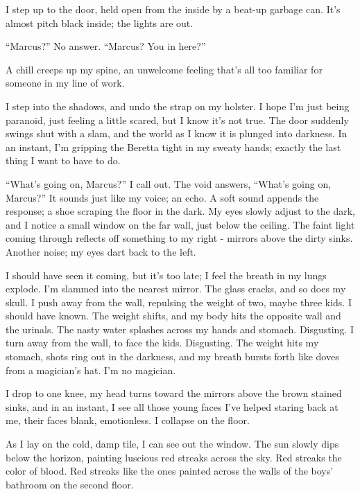I step up to the door, held open from the inside by a beat-up
garbage can. It's almost pitch black inside; the lights are
out.



``Marcus?'' No answer. ``Marcus? You in here?''



A chill creeps up my spine, an unwelcome feeling that's all too
familiar for someone in my line of work.



I step into the shadows, and undo the strap on my holster. I hope
I'm just being paranoid, just feeling a little scared, but I know
it's not true. The door suddenly swings shut with a slam, and the
world as I know it is plunged into darkness. In an instant, I'm
gripping the Beretta tight in my sweaty hands; exactly the last
thing I want to have to do.



``What's going on, Marcus?'' I call out. The void answers, ``What's
going on, Marcus?'' It sounds just like my voice; an echo. A soft
sound appends the response; a shoe scraping the floor in the dark.
My eyes slowly adjust to the dark, and I notice a small window on
the far wall, just below the ceiling. The faint light coming
through reflects off something to my right - mirrors above the
dirty sinks. Another noise; my eyes dart back to the left.



I should have seen it coming, but it's too late; I feel the breath
in my lungs explode. I'm slammed into the nearest mirror. The glass
cracks, and so does my skull. I push away from the wall, repulsing
the weight of two, maybe three kids. I should have known. The
weight shifts, and my body hits the opposite wall and the urinals.
The nasty water splashes across my hands and stomach. Disgusting. I
turn away from the wall, to face the kids. Disgusting. The weight
hits my stomach, shots ring out in the darkness, and my breath
bursts forth like doves from a magician's hat. I'm no
magician.



I drop to one knee, my head turns toward the mirrors above the
brown stained sinks, and in an instant, I see all those young faces
I've helped staring back at me, their faces blank, emotionless. I
collapse on the floor.



As I lay on the cold, damp tile, I can see out the window. The sun
slowly dips below the horizon, painting luscious red streaks across
the sky. Red streaks the color of blood. Red streaks like the ones
painted across the walls of the boys' bathroom on the second
floor.





